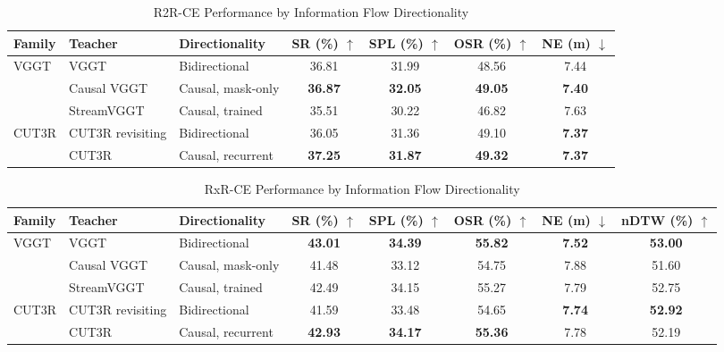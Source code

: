\begin{table}[t]
    \centering
    \small
    \setlength{\tabcolsep}{4.5pt}
    \caption{R2R-CE Performance by Information Flow Directionality}
    \label{tab:r2r_direction}
    \begin{tabular}{lllcccc}
        \toprule
        Family & Teacher & Directionality & SR (\%) $\uparrow$ & SPL (\%) $\uparrow$ & OSR (\%) $\uparrow$ & NE (m) $\downarrow$ \\
        \midrule
        \multirow{3}{*}{VGGT} & VGGT & Bidirectional & 36.81 & 31.99 & 48.56 & 7.44 \\
         & Causal VGGT & Causal, mask-only & \textbf{36.87} & \textbf{32.05} & \textbf{49.05} & \textbf{7.40} \\
         & StreamVGGT & Causal, trained & 35.51 & 30.22 & 46.82 & 7.63 \\
        \midrule
        \multirow{2}{*}{CUT3R} & CUT3R revisiting & Bidirectional & 36.05 & 31.36 & 49.10 & \textbf{7.37} \\
         & CUT3R & Causal, recurrent & \textbf{37.25} & \textbf{31.87} & \textbf{49.32} & \textbf{7.37} \\
        \bottomrule
    \end{tabular}
\end{table}

\begin{table}[t]
    \centering
    \small
    \setlength{\tabcolsep}{4.5pt}
    \caption{RxR-CE Performance by Information Flow Directionality}
    \label{tab:rxr_direction}
    \begin{tabular}{lllccccc}
        \toprule
        Family & Teacher & Directionality & SR (\%) $\uparrow$ & SPL (\%) $\uparrow$ & OSR (\%) $\uparrow$ & NE (m) $\downarrow$ & nDTW (\%) $\uparrow$ \\
        \midrule
        \multirow{3}{*}{VGGT} & VGGT & Bidirectional & \textbf{43.01} & \textbf{34.39} & \textbf{55.82} & \textbf{7.52} & \textbf{53.00} \\
         & Causal VGGT & Causal, mask-only & 41.48 & 33.12 & 54.75 & 7.88 & 51.60 \\
         & StreamVGGT & Causal, trained & 42.49 & 34.15 & 55.27 & 7.79 & 52.75 \\
        \midrule
        \multirow{2}{*}{CUT3R} & CUT3R revisiting & Bidirectional & 41.59 & 33.48 & 54.65 & \textbf{7.74} & \textbf{52.92} \\
         & CUT3R & Causal, recurrent & \textbf{42.93} & \textbf{34.17} & \textbf{55.36} & 7.78 & 52.19 \\
        \bottomrule
    \end{tabular}
\end{table}

